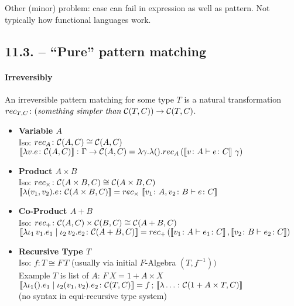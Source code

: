 \documentclass[runningheads,envcountsame]{llncs}
\begin{document}
Other (minor) problem: case can fail in expression as well as pattern. Not typically how functional languages work.

\subsection{11.3. -- “Pure” pattern matching}

\paragraph*{Irreversibly}

An irreversible pattern matching for some type $T$ is a natural transformation $rec_{T, C}\colon (\textit{something simpler than $\mathcal{C}(T, C)$}) \to \mathcal{C}(T, C)$.

\begin{itemize}
    \item \textbf{Variable $A$} \\
          Iso: $rec_A\colon \mathcal{C}(A, C) \cong \mathcal{C}(A, C)$ \\
          $\sem{\elam{v}{e}\colon \homC{A}{C}} \colon \Gamma \to \homC{A}{C} = \lambda \gamma. \lambda (). rec_A\,(\sem{v\colon A \vdash e\colon C}\,\gamma)$
    \item \textbf{Product $A \times B$} \\
          Iso: $rec_{\times}\colon \mathcal{C}(A \times B, C) \cong \mathcal{C}(A \times B, C)$ \\
          $\sem{\elam{\epair{v_1}{v_2}}{e}\colon \homC{A \times B}{C}} = rec_\times\,\sem{v_1\colon A, v_2\colon B \vdash e\colon C}$
    \item \textbf{Co-Product $A + B$} \\
          Iso: $rec_{+}\colon \mathcal{C}(A, C) \times \mathcal{C}(B, C) \cong \mathcal{C}(A + B, C)$ \\
          $\sem{\lambda \eapp{\iota_1}{v_1}. e_1 \mid \eapp{\iota_2}{v_2}. e_2 \colon \homC{A + B}{C}} = rec_+\,(\sem{v_1\colon A \vdash e_1\colon C}, \sem{v_2\colon B \vdash e_2\colon C})$
    \item \textbf{Recursive Type $T$} \\
          Iso: $f\colon T \cong F\,T$ (usually via initial $F$-Algebra $(T, f^{-1}))$ \\
          Example $T$ is list of $A$: $F\,X = 1 + A \times X$ \\
          $\sem{\lambda \iota_1 (). e_1 \mid \iota_2 (v_1, v_2). e_2\colon \homC{T}{C}} = \comp{f}{\sem{\lambda \dots\colon \homC{1 + A \times T}{C}}}$ \\
          (no syntax in equi-recursive type system)
\end{itemize}
\end{document}
